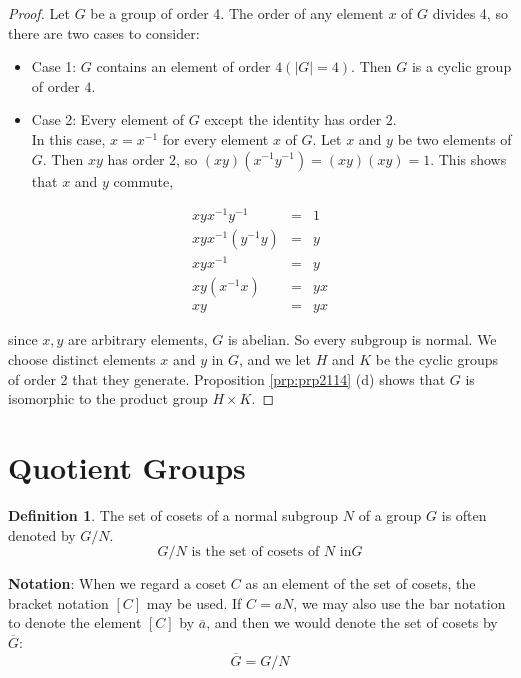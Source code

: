 \documentclass[
]{book}
\providecommand{\tightlist}{%
  \setlength{\itemsep}{0pt}\setlength{\parskip}{0pt}}
\theoremstyle{definition}
\newtheorem{definition}{Definition}[chapter]
\theoremstyle{definition}
\theoremstyle{definition}
\theoremstyle{definition}
\theoremstyle{remark}
\begin{document}
\begin{proof}
Let \(G\) be a group of order 4. The order of any element \(x\) of \(G\) divides 4, so there are two cases to consider:

\begin{itemize}
\tightlist
\item
  Case 1: \(G\) contains an element of order \(4 (|G|=4)\). Then \(G\) is a cyclic group of order \(4\).
\item
  Case 2: Every element of \(G\) except the identity has order \(2\).\\
  In this case, \(x = x^{-1}\) for every element \(x\) of \(G\). Let \(x\) and \(y\) be two elements of \(G\). Then \(xy\) has order \(2\), so \((xy)(x^{-1}y^{-1}) = (xy)(xy) = 1\). This shows that \(x\) and \(y\) commute,
\end{itemize}

\begin{eqnarray}
xyx^{-1}y^{-1} &=& 1\\
xyx^{-1}(y^{-1} y) &=& y\\
xyx^{-1} &=& y\\
xy(x^{-1}x) &=& yx\\
xy &=& yx
\end{eqnarray}

since \(x,y\) are arbitrary elements, \(G\) is abelian. So every subgroup is normal. We choose distinct elements \(x\) and \(y\) in \(G\), and we let \(H\) and \(K\) be the cyclic groups of order 2 that they generate. Proposition \ref{prp:prp2114} (d) shows that \(G\) is isomorphic to the product group \(H \times K\).
\end{proof}

\hypertarget{quotient-groups}{%
\section{Quotient Groups}\label{quotient-groups}}

\begin{definition}
\protect\hypertarget{def:unnamed-chunk-58}{}\label{def:unnamed-chunk-58}The set of cosets of a normal subgroup \(N\) of a group \(G\) is often denoted by \(G / N\).
\[G / N \text{ is the set of cosets of $N$ in} G\]
\end{definition}

\textbf{Notation}: When we regard a coset \(C\) as an element of the set of cosets, the bracket notation \([C]\)
may be used.
If \(C = aN\), we may also use the bar notation to denote the element \([C]\) by \(\overline{a}\),
and then we would denote the set of cosets by \(\overline{G}\):
\[\overline{G} = G /N\]
\end{document}
